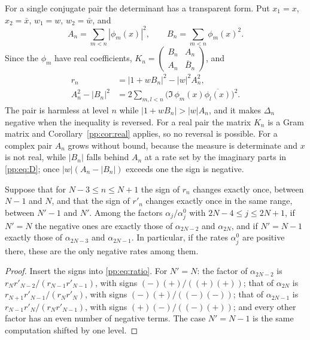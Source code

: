 For a single conjugate pair the determinant has a transparent form. Put $x_1=x$, $x_2=\bar x$, $w_1=w$, $w_2=\bar w$, and
\[
A_n=\sum_{m<n}|\phi_m(x)|^2,\qquad B_n=\sum_{m<n}\phi_m(x)^2 .
\]
Since the $\phi_m$ have real coefficients, $K_n=\begin{pmatrix}B_n&A_n\\A_n&\bar B_n\end{pmatrix}$, and
\begin{equation}\label{pp:eq:D}
\begin{aligned}
r_n&=\big|1+wB_n\big|^2-|w|^2A_n^2,\\
A_n^2-|B_n|^2&=2\sum_{m,l<n}\big(\Im\,\phi_m(x)\overline{\phi_l(x)}\big)^2 .
\end{aligned}
\end{equation}
The pair is harmless at level $n$ while $|1+wB_n|>|w|A_n$, and it makes $\Delta_n$ negative when the inequality is reversed. For a real pair the matrix $K_n$ is a Gram matrix and Corollary~\ref{pp:cor:real} applies, so no reversal is possible. For a complex pair $A_n$ grows without bound, because the measure is determinate and $x$ is not real, while $|B_n|$ falls behind $A_n$ at a rate set by the imaginary parts in \eqref{pp:eq:D}; once $|w|(A_n-|B_n|)$ exceeds one the sign is negative.

\begin{proposition}\label{pp:prop:two}
Suppose that for $N-3\le n\le N+1$ the sign of $r_n$ changes exactly once, between $N-1$ and $N$, and that the sign of $r'_n$ changes exactly once in the same range, between $N'-1$ and $N'$. Among the factors $\alpha_j/\alpha^0_j$ with $2N-4\le j\le2N+1$, if $N'=N$ the negative ones are exactly those of $\alpha_{2N-2}$ and $\alpha_{2N}$, and if $N'=N-1$ exactly those of $\alpha_{2N-3}$ and $\alpha_{2N-1}$. In particular, if the rates $\alpha^0_j$ are positive there, these are the only negative rates among them.
\end{proposition}

\begin{proof}
Insert the signs into \eqref{pp:eq:ratio}. For $N'=N$: the factor of $\alpha_{2N-2}$ is $r_Nr'_{N-2}/(r_{N-1}r'_{N-1})$, with signs $(-)(+)/((+)(+))$; that of $\alpha_{2N}$ is $r_{N+1}r'_{N-1}/(r_Nr'_N)$, with signs $(-)(+)/((-)(-))$; that of $\alpha_{2N-1}$ is $r_{N-1}r'_N/(r_Nr'_{N-1})$, with signs $(+)(-)/((-)(+))$; and every other factor has an even number of negative terms. The case $N'=N-1$ is the same computation shifted by one level.
\end{proof}

